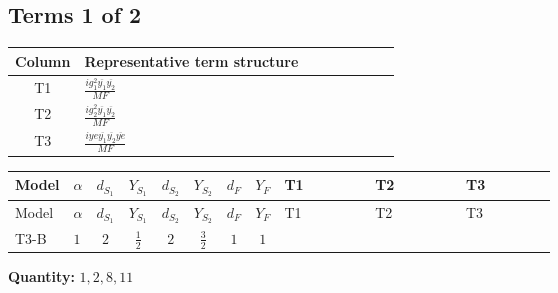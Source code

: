 \documentclass[8pt]{article}
\begin{document}
\begin{landscape}
\subsection*{Terms 1 of 2}
\begin{center}
\begin{tabular}{@{}c >{\raggedright\arraybackslash}p{0.82\linewidth}@{}}
\toprule
Column & Representative term structure \\
\midrule
T1 & \(\displaystyle \frac{i g_{1}^{2} \overline{y_{1}} \overline{y_{2}}}{MF}\) \\
\midrule
T2 & \(\displaystyle \frac{i g_{2}^{2} \overline{y_{1}} \overline{y_{2}}}{MF}\) \\
\midrule
T3 & \(\displaystyle \frac{i ye \overline{y_{1}} \overline{y_{2}} \overline{ye}}{MF}\) \\
\midrule
\bottomrule
\end{tabular}
\end{center}
\smallskip
\tiny
\begin{longtable}{@{}llcccccc >{\raggedright\arraybackslash}p{0.21\linewidth} >{\raggedright\arraybackslash}p{0.21\linewidth} >{\raggedright\arraybackslash}p{0.21\linewidth}@{}}
\toprule
Model & $\alpha$ & $d_{S_1}$ & $Y_{S_1}$ & $d_{S_2}$ & $Y_{S_2}$ & $d_F$ & $Y_F$ & T1 & T2 & T3 \\
\midrule
\endfirsthead
\toprule
Model & $\alpha$ & $d_{S_1}$ & $Y_{S_1}$ & $d_{S_2}$ & $Y_{S_2}$ & $d_F$ & $Y_F$ & T1 & T2 & T3 \\
\midrule
\endhead
T3-B & $1$ & $2$ & $\frac{1}{2}$ & $2$ & $\frac{3}{2}$ & $1$ & $1$ & \scriptsize\adjustbox{max width=\linewidth}{$\begin{gathered} \frac{3 i g_{1}^{2} \overline{y_{1}} \overline{y_{2}}}{4 MF}\end{gathered}$} & \scriptsize\adjustbox{max width=\linewidth}{$\begin{gathered} \frac{3 i g_{2}^{2} \overline{y_{1}} \overline{y_{2}}}{8 MF}\end{gathered}$} & \scriptsize\adjustbox{max width=\linewidth}{$\begin{gathered} - \frac{i ye \overline{y_{1}} \overline{y_{2}} \overline{ye}}{8 MF}\end{gathered}$} \\
\midrule
\bottomrule
\end{longtable}
\clearpage
\noindent\textbf{Quantity: }$\mathrm{1,2,8,11}$\par\smallskip

\end{landscape}
\end{document}
